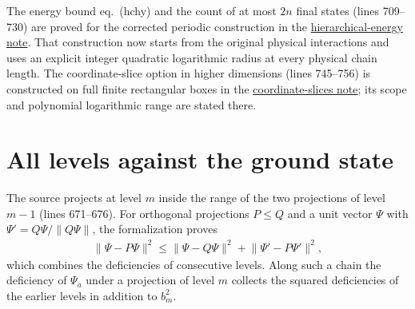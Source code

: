\documentclass{article}
\begin{document}
The energy bound eq.~(hchy) and the count of at most $2n$ final states
(lines 709--730) are proved for the corrected periodic construction in the
\href{hastings05_hierarchical_energy.pdf}{hierarchical-energy note}.
That construction now starts from the original physical interactions and
uses an explicit integer quadratic logarithmic radius at every physical
chain length. The coordinate-slice option in higher dimensions
(lines 745--756) is constructed on full finite rectangular boxes in the
\href{hastings05_coordinate_slices.pdf}{coordinate-slices note}; its
scope and polynomial logarithmic range are stated there.

\section{All levels against the ground state}
\label{sec:hastings05_hierarchical_projection_all_levels}

The source projects at level $m$ inside the
range of the two projections of level $m-1$ (lines 671--676). For orthogonal
projections $P\le Q$ and a unit vector $\Psi$ with
$\Psi'=Q\Psi/\lVert Q\Psi\rVert$, the formalization proves
\begin{align}\label{eq:hastings05_hierarchical_projection_nested_deficiency}
    \lVert\Psi-P\Psi\rVert^2\le\lVert\Psi-Q\Psi\rVert^2
    +\lVert\Psi'-P\Psi'\rVert^2,
\end{align}
which combines the deficiencies of consecutive levels. Along such a chain the
deficiency of $\Psi_a$ under a projection of level $m$ collects the squared
deficiencies of the earlier levels in addition to $b_m^2$.
\end{document}
